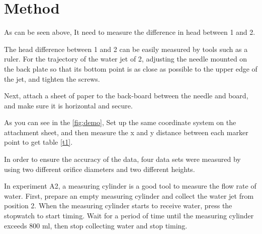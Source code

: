 \section{Method}

As can be seen above,  
It need to measure the difference in head between 1 and 2.

The head difference between 1 and 2 can be easily measured by tools such as a ruler.
For the trajectory of the water jet of 2, 
adjusting the needle mounted on the back plate so that its bottom point is as close as possible 
to the upper edge of the jet, and tighten the screws.

Next, attach a sheet 
of paper to the back-board between the needle and board,
and make sure it is horizontal and secure.

As you can see in the \autoref{fig:demo},
Set up the same coordinate system on the attachment sheet, 
and then measure the x and y distance between each marker point to get table 
\ref{t1}.

In order to ensure the accuracy of the data, 
four data sets were measured by using two different orifice diameters and 
two different heights.





In experiment A2, a measuring cylinder is a good tool to measure the flow rate of water. 
First, prepare an empty measuring cylinder and collect the water jet from position 2. 
When the measuring cylinder starts to receive water, press the stopwatch to start timing. 
Wait for a period of time until the measuring cylinder exceeds 800 ml, 
then stop collecting water and stop timing.

















